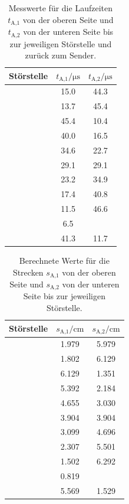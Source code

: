 \begin{table}[h]
  \centering
  \begin{tabular}{S S S}
    \toprule
    {Störstelle} & {$t_\text{A,1}/\si{\micro\second}$} & {$t_\text{A,2}
    /\si{\micro\second}$}\\
    \midrule
     & 15.0 & 44.3 \\
     & 13.7 & 45.4 \\
     & 45.4 & 10.4 \\
     & 40.0 & 16.5 \\
     & 34.6 & 22.7 \\
     & 29.1 & 29.1 \\
     & 23.2 & 34.9 \\
     & 17.4 & 40.8 \\
     & 11.5 & 46.6 \\
     & 6.5 & \text{ } \\
     & 41.3 & 11.7 \\
    \bottomrule
  \end{tabular}
  \caption{Messwerte für die Laufzeiten $t_\text{A,1}$ von der oberen Seite und
  $t_\text{A,2}$ von der unteren Seite bis zur jeweiligen Störstelle und zurück
  zum Sender.}
  \label{tab:AScanZeiten}
\end{table}

\begin{table}[h]
  \centering
  \begin{tabular}{S S S}
    \toprule
    {Störstelle} & {$s_\text{A,1}/\si{\centi\meter}$} & {$s_\text{A,2}
    /\si{\centi\meter}$}\\
    \midrule
     & 1.979 & 5.979 \\
     & 1.802 & 6.129 \\
     & 6.129 & 1.351 \\
     & 5.392 & 2.184 \\
     & 4.655 & 3.030 \\
     & 3.904 & 3.904 \\
     & 3.099 & 4.696 \\
     & 2.307 & 5.501 \\
     & 1.502 & 6.292 \\
     & 0.819 & \text{ } \\
     & 5.569 & 1.529 \\
    \bottomrule
  \end{tabular}
  \caption{Berechnete Werte für die Strecken $s_\text{A,1}$ von der oberen Seite
  und $s_\text{A,2}$ von der unteren Seite bis zur jeweiligen Störstelle.}
  \label{tab:AScanStrecken}
\end{table}

